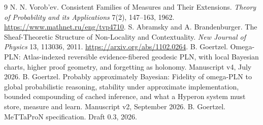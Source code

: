 \documentclass[11pt]{article}
\begin{document}
\begin{thebibliography}{9}
 N. N. Vorob'ev. Consistent Families of Measures and Their
Extensions. \emph{Theory of Probability and its Applications} 7(2), 147--163,
1962. \url{https://www.mathnet.ru/eng/tvp4710}.
 S. Abramsky and A. Brandenburger. The Sheaf-Theoretic
Structure of Non-Locality and Contextuality. \emph{New Journal of Physics} 13,
113036, 2011. \url{https://arxiv.org/abs/1102.0264}.
 B. Goertzel. Omega-PLN: Atlas-indexed reversible evidence-fibered
geodesic PLN, with local Bayesian charts, higher proof geometry, and forgetting
as holonomy. Manuscript v4, July 2026.
 B. Goertzel. Probably approximately Bayesian: Fidelity of
omega-PLN to global probabilistic reasoning, stability under approximate
implementation, bounded compounding of cached inference, and what a Hyperon
system must store, measure and learn. Manuscript v2, September 2026.
 B. Goertzel. MeTTaProN specification. Draft 0.3, 2026.
\end{thebibliography}
\end{document}

